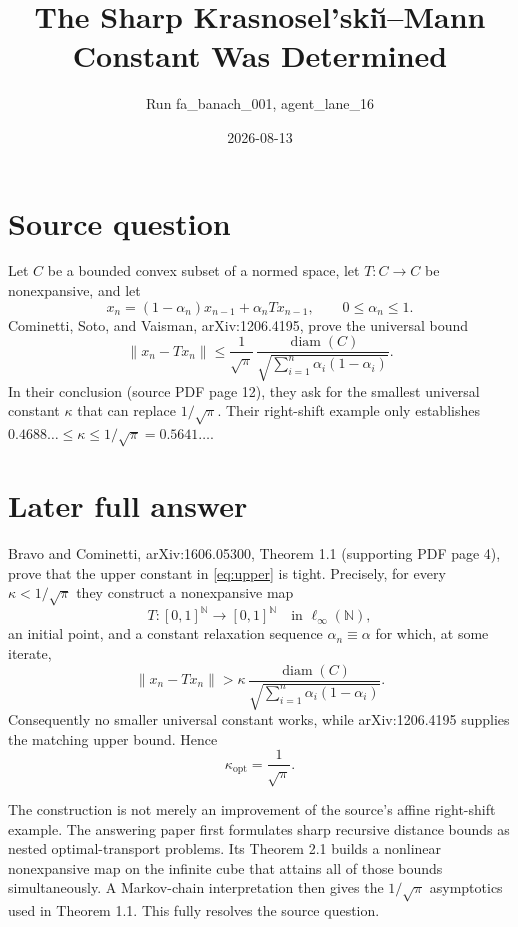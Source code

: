 \documentclass[11pt]{article}
\title{The Sharp Krasnosel'ski\u\i--Mann Constant Was Determined}
\author{Run fa\_banach\_001, agent\_lane\_16}
\date{2026-08-13}
\begin{document}
\maketitle

\section*{Source question}

Let $C$ be a bounded convex subset of a normed space, let
$T:C\to C$ be nonexpansive, and let
\[
 x_n=(1-\alpha_n)x_{n-1}+\alpha_nTx_{n-1},
 \qquad 0\le\alpha_n\le1.
\]
Cominetti, Soto, and Vaisman, arXiv:1206.4195, prove the universal bound
\begin{equation}\label{eq:upper}
 \|x_n-Tx_n\|
 \le \frac{1}{\sqrt\pi}\,
 \frac{\operatorname{diam}(C)}
 {\sqrt{\sum_{i=1}^n\alpha_i(1-\alpha_i)}}.
\end{equation}
In their conclusion (source PDF page 12), they ask for the smallest
universal constant $\kappa$ that can replace $1/\sqrt\pi$.  Their
right-shift example only establishes
$0.4688\ldots\le\kappa\le1/\sqrt\pi=0.5641\ldots$.

\section*{Later full answer}

Bravo and Cominetti, arXiv:1606.05300, Theorem 1.1 (supporting PDF page
4), prove that the upper constant in \eqref{eq:upper} is tight.  Precisely,
for every $\kappa<1/\sqrt\pi$ they construct a nonexpansive map
\[
 T:[0,1]^{\mathbb N}\longrightarrow[0,1]^{\mathbb N}
 \quad\text{in }\ell_\infty(\mathbb N),
\]
an initial point, and a constant relaxation sequence
$\alpha_n\equiv\alpha$ for which, at some iterate,
\[
 \|x_n-Tx_n\|>
 \kappa\,
 \frac{\operatorname{diam}(C)}
 {\sqrt{\sum_{i=1}^n\alpha_i(1-\alpha_i)}}.
\]
Consequently no smaller universal constant works, while
arXiv:1206.4195 supplies the matching upper bound.  Hence
\[
 \boxed{\kappa_{\mathrm{opt}}=\frac1{\sqrt\pi}}.
\]

The construction is not merely an improvement of the source's affine
right-shift example.  The answering paper first formulates sharp recursive
distance bounds as nested optimal-transport problems.  Its Theorem 2.1
builds a nonlinear nonexpansive map on the infinite cube that attains all
of those bounds simultaneously.  A Markov-chain interpretation then gives
the $1/\sqrt\pi$ asymptotics used in Theorem 1.1.  This fully resolves the
source question.
\end{document}
